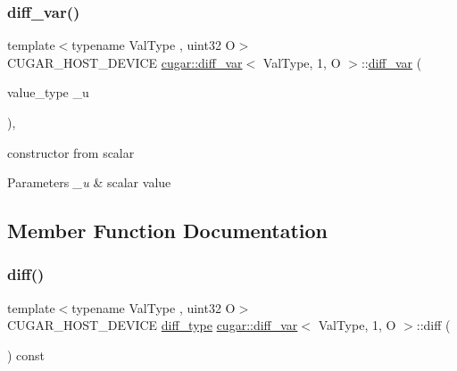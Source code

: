 \subsubsection{\texorpdfstring{diff\+\_\+var()}{diff\_var()}\hspace{0.1cm}{\footnotesize\ttfamily [5/5]}}
{\footnotesize\ttfamily template$<$typename Val\+Type , uint32 O$>$ \\
C\+U\+G\+A\+R\+\_\+\+H\+O\+S\+T\+\_\+\+D\+E\+V\+I\+CE \hyperlink{structcugar_1_1diff__var}{cugar\+::diff\+\_\+var}$<$ Val\+Type, 1, O $>$\+::\hyperlink{structcugar_1_1diff__var}{diff\+\_\+var} (\begin{DoxyParamCaption}\item[{value\+\_\+type}]{\+\_\+u }\end{DoxyParamCaption})\hspace{0.3cm}{\ttfamily [inline]}, {\ttfamily [explicit]}}

constructor from scalar


\begin{DoxyParams}{Parameters}
{\em \+\_\+u} & scalar value \\
\hline
\end{DoxyParams}


\subsection{Member Function Documentation}
\mbox{\label{structcugar_1_1diff__var_3_01_val_type_00_011_00_01_o_01_4_a03a0aa61224d68fc8c5ec3d3e57944f8}} 
\subsubsection{\texorpdfstring{diff()}{diff()}}
{\footnotesize\ttfamily template$<$typename Val\+Type , uint32 O$>$ \\
C\+U\+G\+A\+R\+\_\+\+H\+O\+S\+T\+\_\+\+D\+E\+V\+I\+CE \hyperlink{structcugar_1_1diff__var}{diff\+\_\+type} \hyperlink{structcugar_1_1diff__var}{cugar\+::diff\+\_\+var}$<$ Val\+Type, 1, O $>$\+::diff (\begin{DoxyParamCaption}{ }\end{DoxyParamCaption}) const\hspace{0.3cm}{\ttfamily [inline]}}

